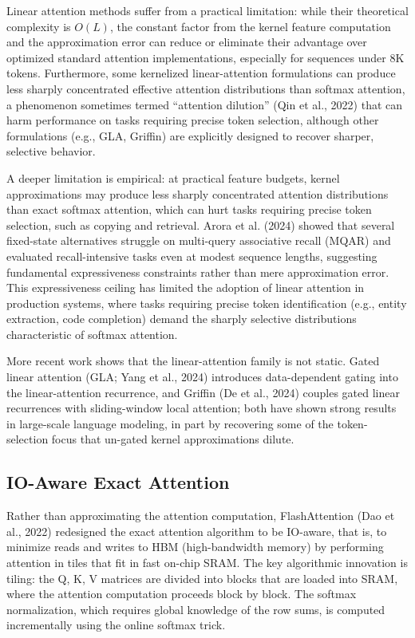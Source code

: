 \documentclass[10pt,twocolumn]{article}
\begin{document}
Linear attention methods suffer from a practical limitation: while their theoretical complexity is $O(L)$, the constant factor from the kernel feature computation and the approximation error can reduce or eliminate their advantage over optimized standard attention implementations, especially for sequences under 8K tokens. Furthermore, some kernelized linear-attention formulations can produce less sharply concentrated effective attention distributions than softmax attention, a phenomenon sometimes termed ``attention dilution'' (Qin et al., 2022) that can harm performance on tasks requiring precise token selection, although other formulations (e.g., GLA, Griffin) are explicitly designed to recover sharper, selective behavior.

A deeper limitation is empirical: at practical feature budgets, kernel approximations may produce less sharply concentrated attention distributions than exact softmax attention, which can hurt tasks requiring precise token selection, such as copying and retrieval. Arora et al. (2024) showed that several fixed-state alternatives struggle on multi-query associative recall (MQAR) and evaluated recall-intensive tasks even at modest sequence lengths, suggesting fundamental expressiveness constraints rather than mere approximation error. This expressiveness ceiling has limited the adoption of linear attention in production systems, where tasks requiring precise token identification (e.g., entity extraction, code completion) demand the sharply selective distributions characteristic of softmax attention.

More recent work shows that the linear-attention family is not static. Gated linear attention (GLA; Yang et al., 2024) introduces data-dependent gating into the linear-attention recurrence, and Griffin (De et al., 2024) couples gated linear recurrences with sliding-window local attention; both have shown strong results in large-scale language modeling, in part by recovering some of the token-selection focus that un-gated kernel approximations dilute.

\subsection{IO-Aware Exact Attention}\label{io-aware-exact-attention}

Rather than approximating the attention computation, FlashAttention (Dao et al., 2022) redesigned the exact attention algorithm to be IO-aware, that is, to minimize reads and writes to HBM (high-bandwidth memory) by performing attention in tiles that fit in fast on-chip SRAM. The key algorithmic innovation is tiling: the Q, K, V matrices are divided into blocks that are loaded into SRAM, where the attention computation proceeds block by block. The softmax normalization, which requires global knowledge of the row sums, is computed incrementally using the online softmax trick.
\end{document}
